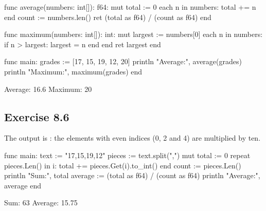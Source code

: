 
\begin{salamcode}
func average(numbers: int[]): f64:
    mut total := 0
    each n in numbers:
        total += n
    end
    count := numbers.len()
    ret (total as f64) / (count as f64)
end

func maximum(numbers: int[]): int:
    mut largest := numbers[0]
    each n in numbers:
        if n > largest: largest = n end
    end
    ret largest
end

func main:
    grades := [17, 15, 19, 12, 20]
    println "Average:", average(grades)
    println "Maximum:", maximum(grades)
end
\end{salamcode}
\begin{salamout}
Average: 16.6
Maximum: 20
\end{salamout}

\subsection*{Exercise 8.6}
The output is \code{[10, 2, 30, 4, 50]}: the elements with even indices
(0, 2 and 4) are multiplied by ten.


\begin{salamcode}
func main:
    text := "17,15,19,12"
    pieces := text.split(",")
    mut total := 0
    repeat pieces.Len() in i:
        total += pieces.Get(i).to_int()
    end
    count := pieces.Len()
    println "Sum:", total
    average := (total as f64) / (count as f64)
    println "Average:", average
end
\end{salamcode}
\begin{salamout}
Sum: 63
Average: 15.75
\end{salamout}
